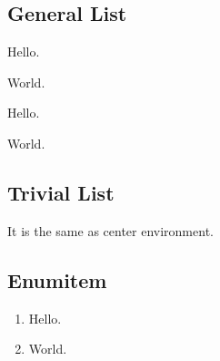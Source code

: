 \subsection{General List}
\begin{list}{\#\themycnt}{}
    \item Hello.
    \item World.
\end{list}

\begin{myitemize}
    \item Hello.
    \item World.
\end{myitemize}

\subsection{Trivial List}
\begin{trivlist}
    \centering
    \item[] It is the same as center environment.
\end{trivlist}

\subsection{Enumitem}
\begin{enumerate}[itemsep=0pt, parsep=0pt, label=(\arabic*)]
    \item Hello.
    \item World.
\end{enumerate}